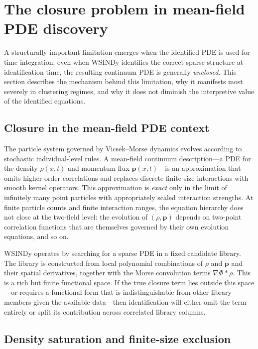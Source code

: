 \section{The closure problem in mean-field PDE discovery}
\label{sec:closure_problem}

A structurally important limitation emerges when the identified PDE is used for
time integration: even when WSINDy identifies the correct sparse structure at
identification time, the resulting continuum PDE is generally \emph{unclosed}.
This section describes the mechanism behind this limitation, why it manifests
most severely in clustering regimes, and why it does not diminish the
interpretive value of the identified equations.

\subsection{Closure in the mean-field PDE context}

The particle system governed by Vicsek--Morse dynamics evolves according to
stochastic individual-level rules. A mean-field continuum description---a PDE
for the density $\rho(x,t)$ and momentum flux $\mathbf{p}(x,t)$---is an
approximation that omits higher-order correlations and replaces discrete
finite-size interactions with smooth kernel operators. This approximation is
\emph{exact} only in the limit of infinitely many point particles with
appropriately scaled interaction strengths. At finite particle counts and
finite interaction ranges, the equation hierarchy does not close at the
two-field level: the evolution of $(\rho,\mathbf{p})$ depends on two-point
correlation functions that are themselves governed by their own evolution
equations, and so on.

WSINDy operates by searching for a sparse PDE in a fixed candidate library.
The library is constructed from local polynomial combinations of
$\rho$ and $\mathbf{p}$ and their spatial derivatives, together with the
Morse convolution terms $\nabla\Phi * \rho$.  This is a rich but finite
functional space.  If the true closure term lies outside this space---or
requires a functional form that is indistinguishable from other library
members given the available data---then identification will either omit the
term entirely or split its contribution across correlated library columns.

\subsection{Density saturation and finite-size exclusion}

